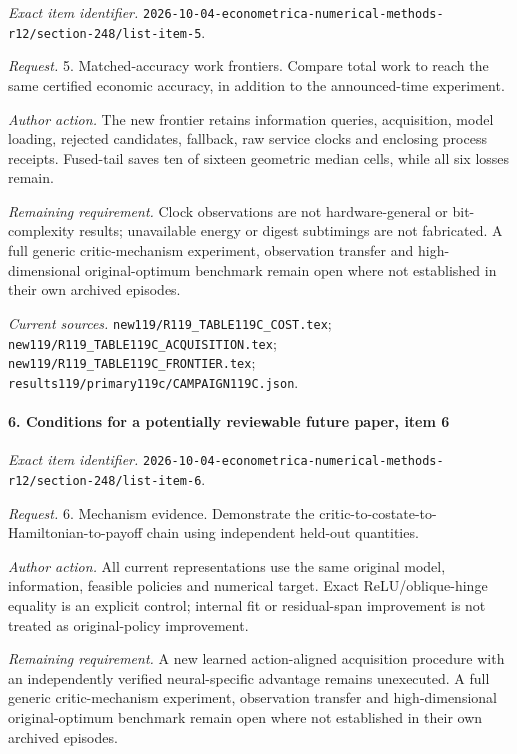 \emph{Exact item identifier.} \nolinkurl{2026-10-04-econometrica-numerical-methods-r12/section-248/list-item-5}.

\par\emph{Request.} 5. Matched-accuracy work frontiers. Compare total work to reach the same certified economic accuracy, in addition to the announced-time experiment.

\par\emph{Author action.} The new frontier retains information queries, acquisition, model loading, rejected candidates, fallback, raw service clocks and enclosing process receipts. Fused-tail saves ten of sixteen geometric median cells, while all six losses remain.

\par\emph{Remaining requirement.} Clock observations are not hardware-general or bit-complexity results; unavailable energy or digest subtimings are not fabricated. A full generic critic-mechanism experiment, observation transfer and high-dimensional original-optimum benchmark remain open where not established in their own archived episodes.

\par\emph{Current sources.} \nolinkurl{new119/R119_TABLE119C_COST.tex}; \nolinkurl{new119/R119_TABLE119C_ACQUISITION.tex}; \nolinkurl{new119/R119_TABLE119C_FRONTIER.tex}; \nolinkurl{results119/primary119c/CAMPAIGN119C.json}.

\paragraph{6. Conditions for a potentially reviewable future paper, item 6}

\emph{Exact item identifier.} \nolinkurl{2026-10-04-econometrica-numerical-methods-r12/section-248/list-item-6}.

\par\emph{Request.} 6. Mechanism evidence. Demonstrate the critic-to-costate-to-Hamiltonian-to-payoff chain using independent held-out quantities.

\par\emph{Author action.} All current representations use the same original model, information, feasible policies and numerical target. Exact ReLU/\allowbreak{}oblique-hinge equality is an explicit control; internal fit or residual-span improvement is not treated as original-policy improvement.

\par\emph{Remaining requirement.} A new learned action-aligned acquisition procedure with an independently verified neural-specific advantage remains unexecuted. A full generic critic-mechanism experiment, observation transfer and high-dimensional original-optimum benchmark remain open where not established in their own archived episodes.

